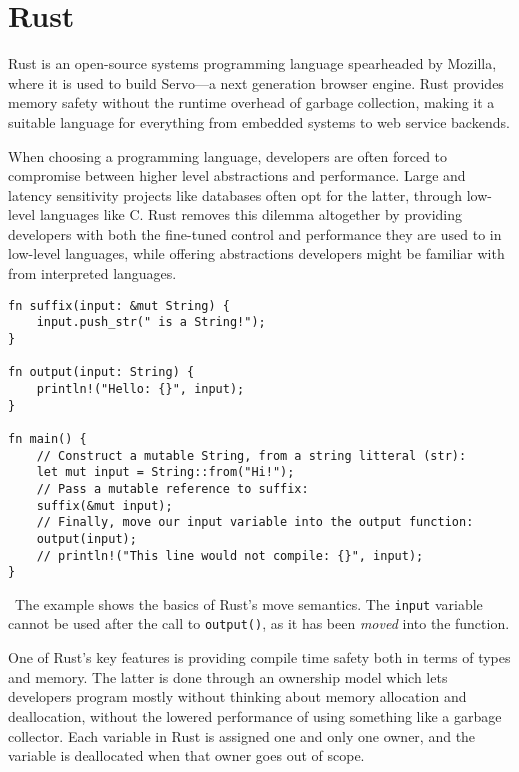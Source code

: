 \section{Rust}\label{sec:rust}

Rust is an open-source systems programming
language spearheaded by Mozilla, where it is used to build Servo---a next
generation browser engine. Rust provides memory safety
without the runtime overhead of \eg garbage collection, making it a suitable
language for everything from embedded systems to web service backends.

When choosing a programming language, developers are often forced to compromise
between higher level abstractions and performance. Large and latency sensitivity
projects like databases often opt for the latter, through low-level languages
like C. Rust removes this dilemma altogether by providing developers with both
the fine-tuned control and performance they are used to in low-level languages,
while offering abstractions developers might be familiar with from interpreted
languages.

\begin{listing}[H]
  \begin{verbatim}
fn suffix(input: &mut String) {
    input.push_str(" is a String!");
}

fn output(input: String) {
    println!("Hello: {}", input);
}

fn main() {
    // Construct a mutable String, from a string litteral (str):
    let mut input = String::from("Hi!");
    // Pass a mutable reference to suffix:
    suffix(&mut input);
    // Finally, move our input variable into the output function:
    output(input);
    // println!("This line would not compile: {}", input);
}
  \end{verbatim}
  \caption{\
    The example shows the basics of Rust's move semantics. The \texttt{input}
    variable cannot be used after the call to \texttt{output()}, as it has been
    \textit{moved} into the function.
  }
\end{listing}

One of Rust’s key features is providing compile time safety both in terms of
types and memory. The latter is done through an ownership model which lets
developers program mostly without thinking about memory allocation and
deallocation, without the lowered performance of using something like a garbage
collector. Each variable in Rust is assigned one and only one owner, and the
variable is deallocated when that owner goes out of scope.

